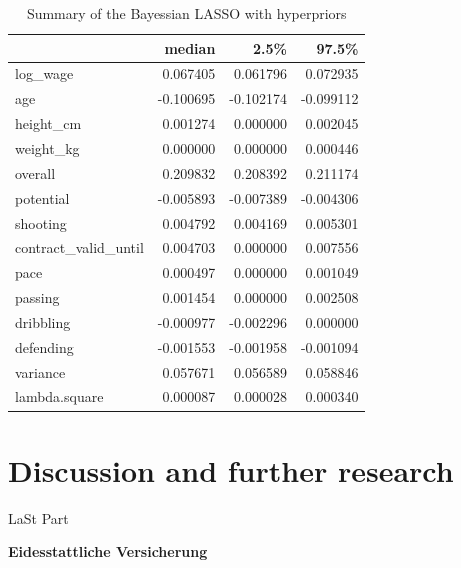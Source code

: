 \documentclass[12pt,a4paper]{article}
\begin{document}
\begin{table}[!h]

\caption{\label{tab:sensity }\label{tab:sum_bay_hy_1} Summary of the  Bayessian LASSO with hyperpriors}
\centering
\begin{tabular}[t]{lrrr}
\toprule
  & median & 2.5\% & 97.5\%\\
\midrule
\rowcolor{gray!6}  log\_wage & 0.067405 & 0.061796 & 0.072935\\
age & -0.100695 & -0.102174 & -0.099112\\
\rowcolor{gray!6}  height\_cm & 0.001274 & 0.000000 & 0.002045\\
weight\_kg & 0.000000 & 0.000000 & 0.000446\\
\rowcolor{gray!6}  overall & 0.209832 & 0.208392 & 0.211174\\
potential & -0.005893 & -0.007389 & -0.004306\\
\rowcolor{gray!6}  shooting & 0.004792 & 0.004169 & 0.005301\\
contract\_valid\_until & 0.004703 & 0.000000 & 0.007556\\
\rowcolor{gray!6}  pace & 0.000497 & 0.000000 & 0.001049\\
passing & 0.001454 & 0.000000 & 0.002508\\
\rowcolor{gray!6}  dribbling & -0.000977 & -0.002296 & 0.000000\\
defending & -0.001553 & -0.001958 & -0.001094\\
\rowcolor{gray!6}  variance & 0.057671 & 0.056589 & 0.058846\\
lambda.square & 0.000087 & 0.000028 & 0.000340\\
\bottomrule
\end{tabular}
\end{table}

\hypertarget{discussion-and-further-research}{%
\section{Discussion and further
research}\label{discussion-and-further-research}}

LaSt Part \newpage
\newpage
\renewcommand*{\mkbibnamefamily}[1]{\textbf{#1}}
\renewcommand*{\mkbibnamegiven}[1]{\textbf{#1}}
\renewcommand*{\mkbibnameprefix}[1]{\textbf{#1}}
\renewcommand*{\mkbibnamesuffix}[1]{\textbf{#1}}


\printbibliography[title=References]


\newpage
\textbf{Eidesstattliche Versicherung}
\end{document}
